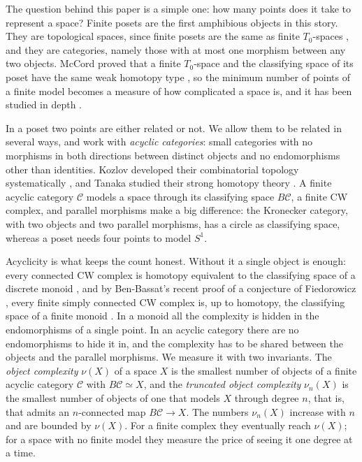 \documentclass[12pt]{amsart}
\theoremstyle{definition}
\theoremstyle{remark}
\newcommand{\CC}{\mathcal{C}}
\begin{document}
The question behind this paper is a simple one: how many points does it take to represent a space? Finite posets are the first amphibious objects in this story. They are topological spaces, since finite posets are the same as finite $T_0$-spaces \cite{Alexandroff1937}, and they are categories, namely those with at most one morphism between any two objects. McCord proved that a finite $T_0$-space and the classifying space of its poset have the same weak homotopy type \cite{McCord1966}, so the minimum number of points of a finite model becomes a measure of how complicated a space is, and it has been studied in depth \cite{BARMAK,BarmakMinian2007,CianciOttina2018}.

In a poset two points are either related or not. We allow them to be related in several ways, and work with \emph{acyclic categories}: small categories with no morphisms in both directions between distinct objects and no endomorphisms other than identities. Kozlov developed their combinatorial topology systematically \cite[Chapters~10 and~14]{Kozlov2008}, and Tanaka studied their strong homotopy theory \cite{Tanaka2019}. A finite acyclic category $\CC$ models a space through its classifying space $B\CC$, a finite CW complex, and parallel morphisms make a big difference: the Kronecker category, with two objects and two parallel morphisms, has a circle as classifying space, whereas a poset needs four points to model $S^1$.

Acyclicity is what keeps the count honest. Without it a single object is enough: every connected CW complex is homotopy equivalent to the classifying space of a discrete monoid \cite{McDuff1979}, and by Ben-Bassat's recent proof of a conjecture of Fiedorowicz \cite[p.~323]{Fiedorowicz1984}, every finite simply connected CW complex is, up to homotopy, the classifying space of a finite monoid \cite{BenBassat2026}. In a monoid all the complexity is hidden in the endomorphisms of a single point. In an acyclic category there are no endomorphisms to hide it in, and the complexity has to be shared between the objects and the parallel morphisms. We measure it with two invariants. The \emph{object complexity} $\nu(X)$ of a space $X$ is the smallest number of objects of a finite acyclic category $\CC$ with $B\CC\simeq X$, and the \emph{truncated object complexity} $\nu_n(X)$ is the smallest number of objects of one that models $X$ through degree $n$, that is, that admits an $n$-connected map $B\CC\to X$. The numbers $\nu_n(X)$ increase with $n$ and are bounded by $\nu(X)$. For a finite complex they eventually reach $\nu(X)$; for a space with no finite model they measure the price of seeing it one degree at a time.
\end{document}
